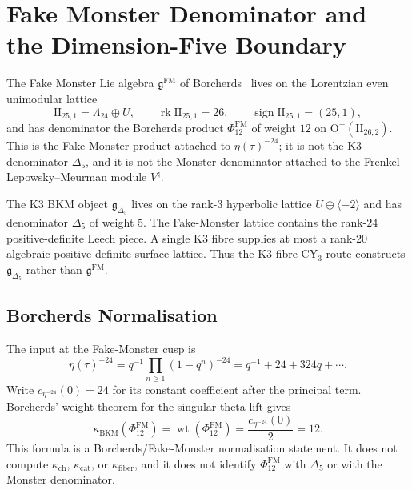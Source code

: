\providecommand{\kBKM}{\kappa_{\mathrm{BKM}}}
\providecommand{\kch}{\kappa_{\mathrm{ch}}}
\providecommand{\kcat}{\kappa_{\mathrm{cat}}}
\providecommand{\kfib}{\kappa_{\mathrm{fiber}}}
\providecommand{\Sp}{\mathrm{Sp}}
\providecommand{\Leech}{\Lambda_{24}}
\providecommand{\IIlor}{\mathrm{II}_{25,1}}
\providecommand{\IIpar}{\mathrm{II}_{26,2}}
\providecommand{\gFM}{\mathfrak{g}^{\mathrm{FM}}}
\providecommand{\gDelta}{\mathfrak{g}_{\Delta_5}}
\providecommand{\PhiFM}{\Phi_{12}^{\mathrm{FM}}}
\providecommand{\HolFA}{\mathrm{HolFA}}
\providecommand{\ChirAlg}{\mathrm{ChirAlg}}

\section{Fake Monster Denominator and the Dimension-Five Boundary}
\label{wn:sec:fake-monster-specialisation}

The Fake Monster Lie algebra $\gFM$ of Borcherds~\cite{Borcherds1990Adv}
lives on the Lorentzian even unimodular lattice
\[
  \IIlor=\Leech\oplus U,
  \qquad \operatorname{rk}\IIlor=26,
  \qquad \operatorname{sign}\IIlor=(25,1),
\]
and has denominator the Borcherds product $\PhiFM$ of weight $12$ on
$\mathrm{O}^{+}(\IIpar)$. This is the Fake-Monster product attached to
$\eta(\tau)^{-24}$; it is not the K3 denominator $\Delta_5$, and it is
not the Monster denominator attached to the Frenkel--Lepowsky--Meurman
module $V^\natural$.

The K3 BKM object $\gDelta$ lives on the rank-$3$ hyperbolic lattice
$U\oplus\langle -2\rangle$ and has denominator $\Delta_5$ of weight $5$.
The Fake-Monster lattice contains the rank-$24$ positive-definite Leech
piece. A single K3 fibre supplies at most a rank-$20$ algebraic
positive-definite surface lattice. Thus the K3-fibre CY$_3$ route
constructs $\gDelta$ rather than $\gFM$.

\subsection{Borcherds Normalisation}
\label{wn:subsec:fake-monster-borcherds-normalisation}

The input at the Fake-Monster cusp is
\[
  \eta(\tau)^{-24}
  =
  q^{-1}\prod_{n\geq 1}(1-q^n)^{-24}
  =
  q^{-1}+24+324q+\cdots .
\]
Write $c_{\eta^{-24}}(0)=24$ for its constant coefficient after the
principal term. Borcherds' weight theorem for the singular theta lift
gives
\[
  \kBKM(\PhiFM)
  =
  \operatorname{wt}(\PhiFM)
  =
  \frac{c_{\eta^{-24}}(0)}{2}
  =
  12.
\]
This formula is a Borcherds/Fake-Monster normalisation statement. It
does not compute $\kch$, $\kcat$, or $\kfib$, and it does not identify
$\PhiFM$ with $\Delta_5$ or with the Monster denominator.

